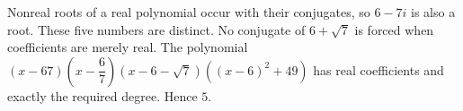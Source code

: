 Nonreal roots of a real polynomial occur with their conjugates, so $6-7i$ is also a root. These five numbers are distinct. No conjugate of $6+\sqrt7$ is forced when coefficients are merely real. The polynomial $(x-67)(x-\dfrac{6}{7})(x-6-\sqrt7)((x-6)^2+49)$ has real coefficients and exactly the required degree. Hence $\boxed5$.
